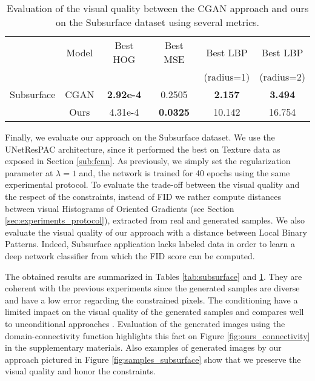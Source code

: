 \begin{table}[t]
	\centering
	\begin{tabular}{|l|c|c|c|c|c|}
		\hline
		&Model           & Best \ac{HOG} & Best \ac{MSE}& Best \ac{LBP} & Best \ac{LBP} \\
		&&& & (radius=1) & (radius=2) \\
		\hline
		Subsurface &CGAN   & \textbf{2.92e-4} & 0.2505 & \textbf{2.157} & \textbf{3.494}\\
		&Ours            &  4.31e-4 &\textbf{0.0325} & 10.142 & 16.754 \\
		\hline
	\end{tabular}
	\caption[Evaluation of the visual quality on the Subsurface dataset]{Evaluation of the visual quality between the CGAN approach and ours on the Subsurface dataset using several metrics.}
	\label{tab:subsurface_visual}
\end{table}

Finally, we evaluate our approach on the Subsurface dataset. We use the UNetResPAC  architecture, since it performed the best on Texture data as exposed in Section \ref{sub:fcnn}. As previously, we simply set the regularization parameter at $\lambda=1$ and, the network is trained for 40 epochs using the same experimental protocol. To evaluate the trade-off between the visual quality and the respect of the constraints, instead of FID we rather compute distances between visual Histograms of Oriented Gradients (see Section \ref{sec:experiments_protocol}), extracted from real and generated samples. We also evaluate the visual quality of our approach with a distance between Local Binary Patterns. Indeed, Subsurface application lacks labeled data in order to learn a deep network classifier from which the FID score can be computed. 


The obtained results are summarized in Tables \ref{tab:subsurface} and \ref{tab:subsurface_visual}. They are coherent with the previous experiments since the generated samples are diverse and have a low error regarding the constrained pixels. The conditioning have a limited impact on the visual quality of the generated samples and compares well to unconditional approaches \citep{Ruffino2017}. Evaluation of the generated images using the domain-connectivity function highlights this fact on Figure \ref{fig:ours_connectivity} in the supplementary materials. Also examples of generated images by our approach  pictured in Figure \ref{fig:samples_subsurface} show that we preserve the visual quality and honor the constraints.


